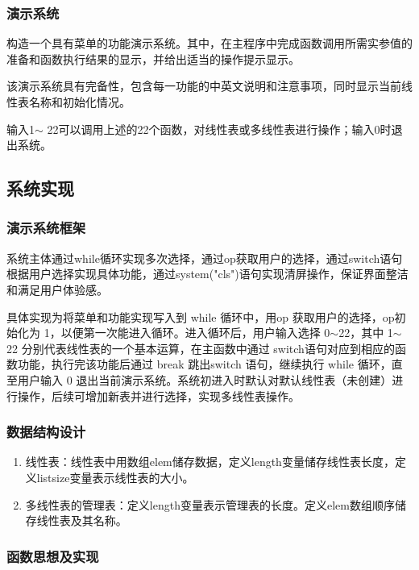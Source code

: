 \documentclass[supercite]{Experimental_Report}
\theoremstyle{definition}
\begin{document}
\subsubsection{演示系统}

构造一个具有菜单的功能演示系统。其中，在主程序中完成函数调用所需实参值的准备和函数执行结果的显示，并给出适当的操作提示显示。

该演示系统具有完备性，包含每一功能的中英文说明和注意事项，同时显示当前线性表名称和初始化情况。

输入1$\sim$ 22可以调用上述的22个函数，对线性表或多线性表进行操作；输入0时退出系统。



\subsection{系统实现}

\subsubsection{演示系统框架}

系统主体通过while循环实现多次选择，通过op获取用户的选择，通过switch语句根据用户选择实现具体功能，通过system("cls")语句实现清屏操作，保证界面整洁和满足用户体验感。

具体实现为将菜单和功能实现写入到 while 循环中，用op 获取用户的选择，op初始化为 1，以便第一次能进入循环。进入循环后，用户输入选择 0$\sim$22，其中 1$\sim$22 分别代表线性表的一个基本运算，在主函数中通过 switch语句对应到相应的函数功能，执行完该功能后通过 break 跳出switch 语句，继续执行 while 循环，直至用户输入 0 退出当前演示系统。系统初进入时默认对默认线性表（未创建）进行操作，后续可增加新表并进行选择，实现多线性表操作。

\subsubsection{数据结构设计}

\begin{enumerate}
	\item 线性表：线性表中用数组elem储存数据，定义length变量储存线性表长度，定义listsize变量表示线性表的大小。
	\item 多线性表的管理表：定义length变量表示管理表的长度。定义elem数组顺序储存线性表及其名称。
	\end{enumerate}

\subsubsection{函数思想及实现}
\end{document}
